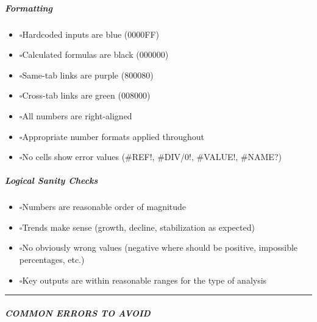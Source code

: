 \documentclass[11pt]{article}
\newcommand{\UncheckedBox}{$\square$}
\begin{document}
\subparagraph{Formatting}\mbox{}\par
\begin{itemize}[leftmargin=*,itemsep=2pt,topsep=2pt]
\item {} \UncheckedBox Hardcoded inputs are blue (0000FF)
\item {} \UncheckedBox Calculated formulas are black (000000)
\item {} \UncheckedBox Same-tab links are purple (800080)
\item {} \UncheckedBox Cross-tab links are green (008000)
\item {} \UncheckedBox All numbers are right-aligned
\item {} \UncheckedBox Appropriate number formats applied throughout
\item {} \UncheckedBox No cells show error values (\#REF!, \#DIV/0!, \#VALUE!, \#NAME?)
\end{itemize}

\subparagraph{Logical Sanity Checks}\mbox{}\par
\begin{itemize}[leftmargin=*,itemsep=2pt,topsep=2pt]
\item {} \UncheckedBox Numbers are reasonable order of magnitude
\item {} \UncheckedBox Trends make sense (growth, decline, stabilization as expected)
\item {} \UncheckedBox No obviously wrong values (negative where should be positive, impossible percentages, etc.)
\item {} \UncheckedBox Key outputs are within reasonable ranges for the type of analysis
\end{itemize}

\vspace{0.5em}\hrule\vspace{0.5em}

\subparagraph{COMMON ERRORS TO AVOID}\mbox{}\par
\end{document}

